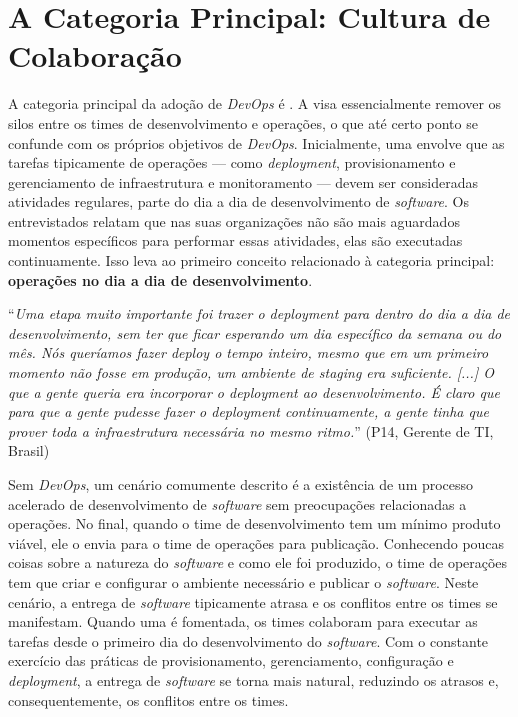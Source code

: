 \section{A Categoria Principal: Cultura de Colaboração}\label{secao_core_category}

A categoria principal da adoção de {\it DevOps} é \cc. A \cc visa essencialmente
remover os silos entre os times de desenvolvimento e operações, o que até certo
ponto se confunde com os próprios objetivos de {\it DevOps}. Inicialmente, uma
\cc envolve que as tarefas tipicamente de operações --- como {\it deployment},
provisionamento e gerenciamento de infraestrutura e monitoramento --- devem ser
consideradas atividades regulares, parte do dia a dia de desenvolvimento de
{\it software}. Os entrevistados relatam que nas suas organizações não são
mais aguardados momentos específicos para performar essas atividades, elas são
executadas continuamente. Isso leva ao primeiro conceito relacionado à
categoria principal: {\bf operações no dia a dia de desenvolvimento}.

\begin{mq}
``\emph{Uma etapa muito importante foi trazer o {\it deployment} para dentro do
dia a dia de desenvolvimento, sem ter que ficar esperando um dia específico
da semana ou do mês. Nós queríamos fazer {\it deploy} o tempo inteiro, mesmo
que em um primeiro momento não fosse em produção, um ambiente de {\it staging}
era suficiente. [...] O que a gente queria era incorporar o {\it deployment} ao
desenvolvimento. É claro que para que a gente pudesse fazer o {\it deployment}
continuamente, a gente tinha que prover toda a infraestrutura necessária no
mesmo ritmo.}'' (P14, Gerente de \acrshort{TI}, Brasil)
\end{mq}

Sem {\it DevOps}, um cenário comumente descrito é a existência de um processo acelerado de
desenvolvimento de {\it software} sem preocupações relacionadas a operações.
No final, quando o time de desenvolvimento tem um mínimo produto viável, ele
o envia para o time de operações para publicação. Conhecendo poucas coisas sobre
a natureza do {\it software} e como ele foi produzido, o time de operações tem
que criar e configurar o ambiente necessário e publicar o {\it software}. Neste
cenário, a entrega de {\it software} tipicamente atrasa e os conflitos entre
os times se manifestam. Quando uma \cc é fomentada, os times colaboram para
executar as tarefas desde o primeiro dia do desenvolvimento do {\it software}.
Com o constante exercício das práticas de provisionamento, gerenciamento,
configuração e {\it deployment}, a entrega de {\it software} se torna mais
natural, reduzindo os atrasos e, consequentemente, os conflitos entre os times.

